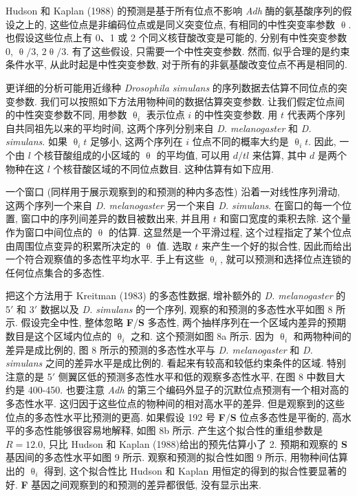 \documentclass[12pt]{article}
\begin{document}
Hudson 和 Kaplan (1988) 的预测是基于所有位点不影响 \textit{Adh} 酶的氨基酸序列的假设之上的,
这些位点是非编码位点或是同义突变位点, 有相同的中性突变率参数 $\uptheta$. 也假设这些位点上有 0、1 或 2
个同义核苷酸改变是可能的, 分别有中性突变参数 0, $\uptheta /3$, $2 \uptheta /3$. 有了这些假设, 只需要一个中性突变参数. 然而,
似乎合理的是约束条件水平, 从此时起是中性突变参数, 对于所有的非氨基酸改变位点不再是相同的.

更详细的分析可能用近缘种 \textit{Drosophila simulans} 的序列数据去估算不同位点的突变参数.
我们可以按照如下方法用物种间的数据估算突变参数. 让我们假定位点间的中性突变参数不同, 用参数 $\uptheta_{i}$ 表示位点 $i$
的中性突变参数. 用 $t$ 代表两个序列自共同祖先以来的平均时间, 这两个序列分别来自 \textit{D. melanogaster} 和
\textit{D. simulans}. 如果 $\uptheta_{i}t$ 足够小, 这两个序列在 $i$ 位点不同的概率大约是 $\uptheta_{i}t$. 因此,
一个由 $l$ 个核苷酸组成的小区域的 $\uptheta$ 的平均值, 可以用 $d/tl$ 来估算, 其中 $d$ 是两个物种在这 $l$
个核苷酸区域的不同位点数目. 这种估算有如下应用.

一个窗口 (同样用于展示观察到的和预测的种内多态性) 沿着一对线性序列滑动, 这两个序列一个来自 \textit{D.
    melanogaster} 另一个来自 \textit{D. simulans}. 在窗口的每一个位置, 窗口中的序列间差异的数目被数出来, 并且用 $t$
和窗口宽度的乘积去除. 这个量作为窗口中间位点的 $\uptheta$ 的估算. 这显然是一个平滑过程,
这个过程指定了某个位点由周围位点变异的积累所决定的 $\uptheta$ 值. 选取 $t$ 来产生一个好的拟合性,
因此而给出一个符合观察值的多态性平均水平. 手上有这些 $\uptheta_{i}$, 就可以预测和选择位点连锁的任何位点集合的多态性.

把这个方法用于 Kreitman (1983) 的多态性数据, 增补额外的 \textit{D. melanogaster} 的 5${\prime}$ 和
3${\prime}$ 数据以及 \textit{D. simulans} 的一个序列, 观察的和预测的多态性水平如图 8 所示. 假设完全中性,
整体忽略 \textbf{F}/\textbf{S} 多态性, 两个抽样序列在一个区域内差异的预期数目是这个区域内位点的 $\uptheta _{i}$ 之和.
这个预测如图 8a 所示. 因为 $\uptheta _{i}$ 和两物种间的差异是成比例的, 图 8 所示的预测的多态性水平与 \textit{D.
    melanogaster} 和 \textit{D. simulans} 之间的差异水平是成比例的. 看起来有较高和较低约束条件的区域. 特别注意的是
5${\prime}$ 侧翼区低的预测多态性水平和低的观察多态性水平, 在图 8 中数目大约是 400-450.
也要注意 \textit{Adh} 的第三个编码外显子的沉默位点预测有一个相对高的多态性水平. 这归因于这些位点的物种间的相对高水平的差异.
但是观察到的这些位点的多态性水平比预测的更高. 如果假设 192 号 \textbf{F}/\textbf{S} 位点多态性是平衡的,
高水平的多态性能够很容易地解释, 如图 8b 所示. 产生这个拟合性的重组参数是 $R=12.0$, 只比 Hudson 和
Kaplan (1988)给出的预先估算小了 2. 预期和观察的 \textbf{S} 基因间的多态性水平如图 9 所示. 观察和预测的拟合性如图 9
所示, 用物种间估算出的 $\uptheta _{i}$ 得到, 这个拟合性比 Hudson 和 Kaplan 用恒定的得到的拟合性要显著的好.
\textbf{F} 基因之间观察到的和预测的差异都很低, 没有显示出来.
\end{document}
